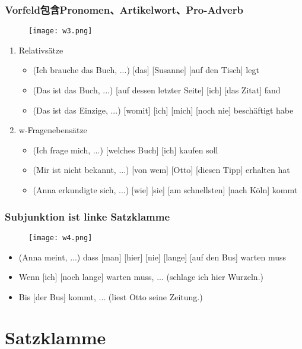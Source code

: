 \documentclass[UTF8]{report}
\begin{document}
\subsubsection{Vorfeld包含Pronomen、Artikelwort、Pro-Adverb}
\begin{figure}[H]
    \centering
    \texttt{[image: w3.png]}
\end{figure}
\begin{enumerate}
    \item Relativsätze
    \begin{itemize}
        \item (Ich brauche das Buch, ...) [das]  [Susanne] [auf den Tisch] legt
        \item (Das ist das Buch, ...) [auf dessen letzter Seite]  [ich] [das Zitat] fand
        \item (Das ist das Einzige, ...) [womit]  [ich] [mich] [noch nie] beschäftigt habe
    \end{itemize}
    \item w-Fragenebensätze
    \begin{itemize}
        \item (Ich frage mich, ...) [welches Buch]  [ich] kaufen soll
        \item (Mir ist nicht bekannt, ...) [von wem]  [Otto] [diesen Tipp] erhalten hat
        \item (Anna erkundigte sich, ...) [wie]  [sie] [am schnellsten] [nach Köln] kommt
    \end{itemize}
\end{enumerate}


\subsubsection{Subjunktion ist linke Satzklamme}
\begin{figure}[H]
    \centering
    \texttt{[image: w4.png]}
\end{figure}
\begin{itemize}
    \item (Anna meint, ...) dass [man] [hier] [nie] [lange] [auf den Bus] warten muss
    \item Wenn [ich] [noch lange] warten muss, ... (schlage ich hier Wurzeln.)
    \item Bis [der Bus] kommt, ... (liest Otto seine Zeitung.)
\end{itemize}



\section{Satzklamme}
\end{document}
